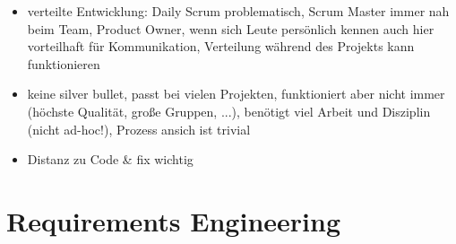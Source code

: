 \documentclass[paper=a4, fontsize=11pt]{scrartcl} %
\numberwithin{equation}{section} %
\numberwithin{figure}{section} %
\numberwithin{table}{section} %
\begin{document}
\begin{itemize}
\begin{itemize}
\begin{itemize}
      \item verteilte Entwicklung: Daily Scrum problematisch, Scrum Master immer nah beim Team, Product Owner, wenn sich Leute persönlich kennen auch hier vorteilhaft für Kommunikation, Verteilung während des Projekts kann funktionieren
      \item keine silver bullet, passt bei vielen Projekten, funktioniert aber nicht immer (höchste Qualität, große Gruppen, ...), benötigt viel Arbeit und Disziplin (nicht ad-hoc!), Prozess ansich ist trivial
      \item Distanz zu Code \& fix wichtig
    \end{itemize}
  \end{itemize}
\end{itemize}

\section{Requirements Engineering}
\end{document}
